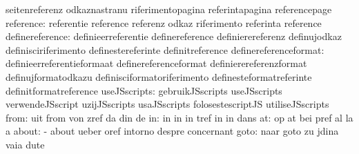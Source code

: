                                   seitenreferenz                   odkaznastranu
                                  riferimentopagina                referintapagina
                                  referencepage
                       reference: referentie                       reference
                                  referenz                         odkaz
                                  riferimento                      referinta
                                  reference
                 definereference: definieerreferentie              definereference
                                  definierereferenz                definujodkaz
                                  definisciriferimento             definestereferinte
                                  definitreference
           definereferenceformat: definieerreferentieformaat       definereferenceformat
                                  definierereferenzformat          definujformatodkazu
                                  definisciformatoriferimento      definesteformatreferinte
                                  definitformatreference
                    useJSscripts: gebruikJSscripts                 useJSscripts
                                  verwendeJSscript                 uzijJSscripts
                                  usaJSscripts                     folosestescriptJS
                                  utiliseJSscripts
                            from: uit                              from
                                  von                              zref
                                  da                               din
                                  de
                              in: in                               in
                                  in                               tref
                                  in                               in
                                  dans
                              at: op                               at
                                  bei                              pref
                                  al                               la
                                  a
                           about: -                                about
                                  ueber                            oref
                                  intorno                          despre
                                  concernant
                            goto: naar                             goto
                                  zu                               jdina
                                  vaia                             dute
